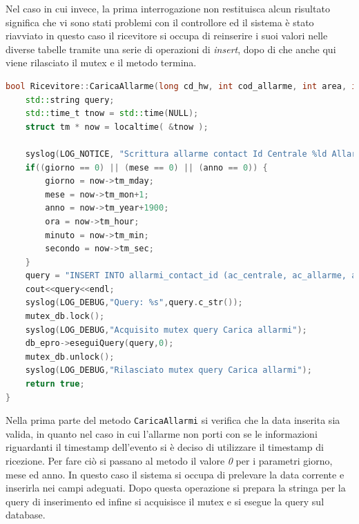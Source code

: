 Nel caso in cui invece, la prima interrogazione non restituisca alcun risultato significa che vi sono stati problemi con il controllore ed il sistema è stato riavviato in questo caso il ricevitore si occupa di reinserire i suoi valori nelle diverse tabelle tramite una serie di operazioni di \emph{insert}, dopo di che anche qui viene rilasciato il mutex e il metodo termina.
\begin{lstlisting}[language=C++,caption=Metodo CaricaAllarme,label=lst:CaricaAllarme]
bool Ricevitore::CaricaAllarme(long cd_hw, int cod_allarme, int area, int zona, int giorno, int mese, int anno, int ora, int minuto, int secondo) {
    std::string query;
    std::time_t tnow = std::time(NULL);
    struct tm * now = localtime( &tnow );
	
    syslog(LOG_NOTICE, "Scrittura allarme contact Id Centrale %ld Allarme: %d, Area: %d Zona: %d Data: %d:%d:%d %d/%d/%d",cd_hw, cod_allarme, area, zona, ora, minuto, secondo, giorno,mese,anno);
    if((giorno == 0) || (mese == 0) || (anno == 0)) {
        giorno = now->tm_mday;
        mese = now->tm_mon+1;
        anno = now->tm_year+1900;
        ora = now->tm_hour;
        minuto = now->tm_min;
        secondo = now->tm_sec;
    }
    query = "INSERT INTO allarmi_contact_id (ac_centrale, ac_allarme, ac_area, ac_zona, ac_giorno, ac_mese, ac_anno, ac_ora, ac_minuto, ac_secondo, ac_porta_seriale, ac_n_ricevitore, ac_n_gruppo) VALUES ('"+std::to_string(cd_hw)+"','"+std::to_string(cod_allarme)+"','"+std::to_string(area)+"','"+std::to_string(zona)+"','"+std::to_string(giorno)+"','"+std::to_string(mese)+"','"+std::to_string(anno)+"','"+std::to_string(ora)+"','"+std::to_string(minuto)+"','"+std::to_string(secondo)+"','"+std::to_string(nseriale)+"','"+std::to_string(nricevitore)+"','1');";
    cout<<query<<endl;
    syslog(LOG_DEBUG,"Query: %s",query.c_str());
    mutex_db.lock();
    syslog(LOG_DEBUG,"Acquisito mutex query Carica allarmi");
    db_epro->eseguiQuery(query,0);
    mutex_db.unlock();
    syslog(LOG_DEBUG,"Rilasciato mutex query Carica allarmi");
    return true;
}
\end{lstlisting}
Nella prima parte del metodo \texttt{CaricaAllarmi} si verifica che la data inserita sia valida, in quanto nel caso in cui l'allarme non porti con se le informazioni riguardanti il timestamp dell'evento si è deciso di utilizzare il timestamp di ricezione. Per fare ciò si passano al metodo il valore \emph{0} per i parametri giorno, mese ed anno. In questo caso il sistema si occupa di prelevare la data corrente e inserirla nei campi adeguati. Dopo questa operazione si prepara la stringa per la query di inserimento ed infine si acquisisce il mutex e si esegue la query sul database.
